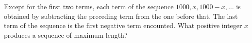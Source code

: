 Except for the first two terms, each term of the sequence $1000, x, 1000-x,\ldots$ is obtained by subtracting the preceding term from the one before that.  The last term of the sequence is the first negative term encounted.  What positive integer $x$ produces a sequence of maximum length?